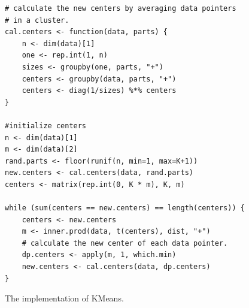\begin{figure}[t]
\begin{verbatim}
# calculate the new centers by averaging data pointers
# in a cluster.
cal.centers <- function(data, parts) {
	n <- dim(data)[1]
	one <- rep.int(1, n)
	sizes <- groupby(one, parts, "+")
	centers <- groupby(data, parts, "+")
	centers <- diag(1/sizes) %*% centers
}

#initialize centers
n <- dim(data)[1]
m <- dim(data)[2]
rand.parts <- floor(runif(n, min=1, max=K+1))
new.centers <- cal.centers(data, rand.parts)
centers <- matrix(rep.int(0, K * m), K, m)

while (sum(centers == new.centers) == length(centers)) {
	centers <- new.centers
	m <- inner.prod(data, t(centers), dist, "+")
	# calculate the new center of each data pointer.
	dp.centers <- apply(m, 1, which.min)
	new.centers <- cal.centers(data, dp.centers)
}
\end{verbatim}
\vspace{-5pt}
\caption{The implementation of KMeans.}
\label{fig:kmeans}
\end{figure}

